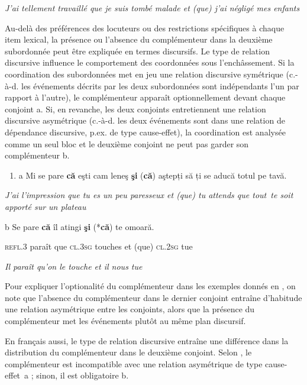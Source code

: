 {\itshape
J'ai tellement travaillé que je suis tombé malade et (que) j'ai négligé mes enfants}

Au-delà des préférences des locuteurs ou des restrictions spécifiques à chaque item lexical, la présence ou l'absence du complémenteur dans la deuxième subordonnée peut être expliquée en termes discursifs. Le type de relation discursive influence le comportement des coordonnées sous l'enchâssement. Si la coordination des subordonnées met en jeu une relation discursive symétrique (c.-à-d. les événements décrits par les deux subordonnées sont indépendants l'un par rapport à l'autre), le complémenteur apparaît optionnellement devant chaque conjoint a. Si, en revanche, les deux conjoints entretiennent une relation discursive asymétrique (c.-à-d. les deux événements sont dans une relation de dépendance discursive, p.ex. de type cause-effet), la coordination est analysée comme un seul bloc et le deuxième conjoint ne peut pas garder son complémenteur b. 


\begin{enumerate}
\item \label{bkm:Ref269990986}a  Mi se pare \textbf{că} eşti cam leneş \textbf{şi} (\textbf{că}) aştepți să ți se aducă totul pe tavă.


\end{enumerate}
{\itshape
J'ai l'impression que tu es un peu paresseux et (que) tu attends que tout~te soit apporté sur un plateau} 

  b  Se  pare  \textbf{că}  îl  atingi  \textbf{şi}  (*\textbf{că})  te  omoară. 

    \textsc{refl.3 } paraît  que  \textsc{cl.3sg}  touches  et  (que)  \textsc{cl.2sg } tue

{\itshape
Il paraît qu'on le touche et il nous tue}

Pour expliquer l'optionalité du complémenteur dans les exemples donnés en , on note que l'absence du complémenteur dans le dernier conjoint entraîne d'habitude une relation asymétrique entre les conjoints, alors que la présence du complémenteur met les événements plutôt au même plan discursif. 

En français aussi, le type de relation discursive entraîne une différence dans la distribution du complémenteur dans le deuxième conjoint. Selon \citet{Piscone2009}, le complémenteur est incompatible avec une relation asymétrique de type cause-effet~a ; sinon, il est obligatoire b. 


